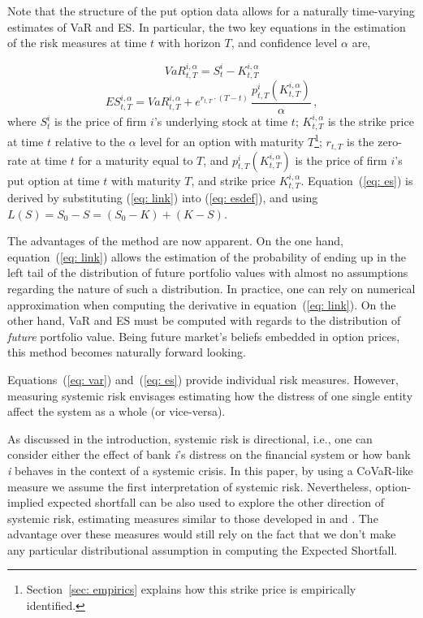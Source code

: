 \documentclass[11pt,a4paper,english]{article}
\begin{document}
Note that the structure of the put option data allows for a naturally time-varying estimates of VaR and ES. In particular, the two key equations in the estimation of the risk measures at time $t$ with horizon $T$, and confidence level $\alpha$ are,

\begin{equation}
\label{eq: var}
VaR^{i, \alpha}_{t,T}= S^i_t - K^{i,\alpha}_{t,T}
\end{equation}
\begin{equation}
\label{eq: es}
ES^{i,\alpha}_{t,T} = VaR^{i, \alpha}_{t,T} + e^{r_{t,T}\cdot (T-t)}\, \frac{p^{i}_{t,T}(K^{i,\alpha}_{t,T})}{\alpha} \, ,
\end{equation}
where $S^i_t$ is the price of firm $i$'s underlying stock at time $t$; $K^{i,\alpha}_{t,T}$ is the strike price at time $t$ relative to the $\alpha$ level for an option with maturity $T$\footnote{Section~\ref{sec: empirics} explains how this strike price is empirically identified.}; $r_{t,T}$ is the zero-rate at time $t$ for a maturity equal to $T$, and $p^{i}_{t,T}(K^{i,\alpha}_{t,T})$ is the price of firm $i$'s put option at time $t$ with maturity $T$, and strike price $K^{i,\alpha}_{t,T}$. Equation~(\ref{eq: es}) is derived by substituting (\ref{eq: link}) into (\ref{eq: esdef}), and using $L(S)=S_0-S=(S_0-K)+(K-S)$. 

The advantages of the method are now apparent. On the one hand, equation~(\ref{eq: link}) allows the estimation of the probability of ending up in the left tail of the distribution of future portfolio values with almost no assumptions regarding the nature of such a distribution. In practice, one can rely on numerical approximation when computing the derivative in equation~(\ref{eq: link}). On the other hand, VaR and ES must be computed with regards to the distribution of \textit{future} portfolio value. Being future market's beliefs embedded in option prices, this method becomes naturally forward looking.

Equations~(\ref{eq: var}) and~(\ref{eq: es}) provide individual risk measures. However, measuring systemic risk envisages estimating how the distress of one single entity affect the system as a whole (or vice-versa).

As discussed in the introduction, systemic risk is directional, i.e., one can consider either the effect of bank \textit{i}'s distress on the financial system or how bank \textit{i} behaves in the context of a systemic crisis. In this paper, by using a CoVaR-like measure we assume the first interpretation of systemic risk. Nevertheless, option-implied expected shortfall can be also used to explore the other direction of systemic risk, estimating measures similar to those developed in \citet{Acharya2017} and \citet{Brownless2016}. The advantage over these measures would still rely on the fact that we don't make any particular distributional assumption in computing the Expected Shortfall.
\end{document}

